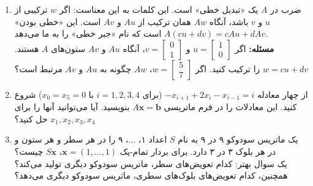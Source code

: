 \documentclass[12pt, a4paper]{book}
\begin{document}
\begin{enumerate}[label=\arabic*.]
		\item
		ضرب در $A$ یک «تبدیل خطی» است. این کلمات به این معناست: اگر $w$ ترکیبی از $u$ و $v$ باشد، آنگاه $Aw$ همان ترکیب از $Au$ و $Av$ است. این «خطی بودن» $A(cu+dv)=cAu+dAv$ است که نام «جبر خطی» را به ما می‌دهد. \\
		\textbf{مسئله:} اگر $u=\begin{bmatrix} 1 \\ 0 \end{bmatrix}$ و $v=\begin{bmatrix} 0 \\ 1 \end{bmatrix}$، آنگاه $Au$ و $Av$ ستون‌های $A$ هستند. $w=cu+dv$ را ترکیب کنید. اگر $w=\begin{bmatrix} 5 \\ 7 \end{bmatrix}$، $Aw$ چگونه به $Au$ و $Av$ مرتبط است؟
		
		\item
		از چهار معادله $-x_{i+1} + 2x_i - x_{i-1} = i$ (برای $i=1,2,3,4$ با $x_0=x_5=0$) شروع کنید. این معادلات را در فرم ماتریسی $A\mathbf{x}=\mathbf{b}$ بنویسید. آیا می‌توانید آنها را برای $x_1, x_2, x_3, x_4$ حل کنید؟
		
		\item
		یک ماتریس سودوکو ۹ در ۹ به نام $S$ اعداد ۱، ...، ۹ را در هر سطر و هر ستون و در هر بلوک ۳ در ۳ دارد. برای بردار تمام-یک $\mathbf{x}=(1,...,1)$، $S\mathbf{x}$ چیست؟ \\
		یک سوال بهتر: کدام تعویض‌های سطر، ماتریس سودوکو دیگری تولید می‌کند؟ همچنین، کدام تعویض‌های بلوک‌های سطری، ماتریس سودوکو دیگری می‌دهد؟
	\end{enumerate}
	
\end{document}
